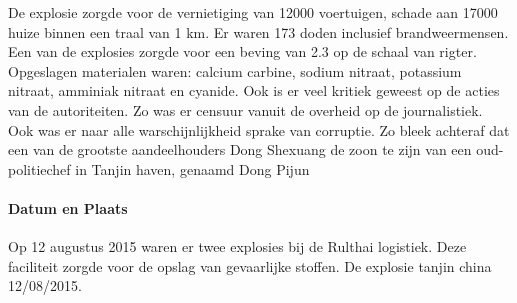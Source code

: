 \documentclass{article}
\begin{document}
	De explosie zorgde voor de vernietiging van 12000 voertuigen, schade aan 17000 huize binnen een traal van 1 km. Er waren 173 doden inclusief brandweermensen.
	Een van de explosies zorgde voor  een beving van 2.3 op de schaal van rigter.
	Opgeslagen materialen  waren: calcium carbine, sodium nitraat, potassium nitraat, amminiak nitraat en cyanide.
	Ook is er veel kritiek geweest op de acties van de autoriteiten. Zo was er censuur vanuit de overheid op de journalistiek.
	Ook was er naar alle warschijnlijkheid sprake van corruptie. Zo bleek achteraf dat een van de grootste aandeelhouders Dong Shexuang de zoon te zijn van een oud-politiechef in Tanjin haven, genaamd Dong Pijun
	\paragraph{Datum en Plaats} 	\newline \indent 
	Op 12 augustus 2015 waren er twee explosies bij de Rulthai logistiek. Deze faciliteit zorgde voor de opslag van  gevaarlijke stoffen.
	De explosie tanjin china 12/08/2015. 
	
\end{document}
